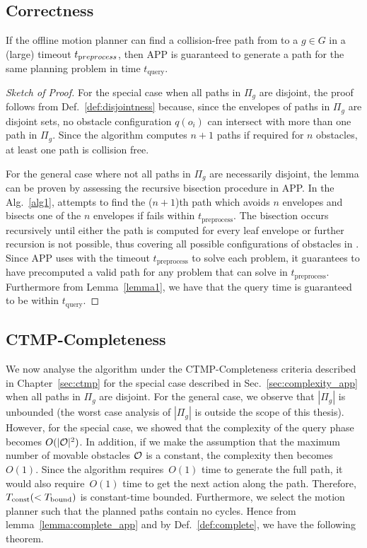 \documentclass[a4paper]{report}
\begin{document}
\subsection{Correctness}
\begin{lemma}
\label{lemma:complete_app}
If the offline motion planner \calP can find a collision-free path from \Sstart to a $g \in G$ in a (large) timeout $t_{\textrm preprocess}$, then APP is guaranteed to generate a path for the same planning problem in time $t_{\textrm {query}}$.
\end{lemma}
\begin{proof}[Sketch of Proof]
For the special case when all paths in $\Pi_g$ are disjoint, the proof follows from Def.~\ref{def:disjointness} because, since the envelopes of paths in $\Pi_g$ are disjoint sets, no obstacle configuration $q(o_i)$ can intersect with more than one path in $\Pi_g$. Since the algorithm computes $n+1$ paths if required for $n$ obstacles, at least one path is collision free.

For the general case where not all paths in $\Pi_g$ are necessarily disjoint, the lemma can be proven by assessing the recursive bisection procedure in APP. In the Alg.~\ref{alg1}, \calP attempts to find the ($n+1$)th path which avoids $n$ envelopes and bisects one of the $n$ envelopes if \calP fails within $t_{\textrm {preprocess}}$. The bisection occurs recursively until either the path is computed for every leaf envelope or further recursion is not possible, thus covering all possible configurations of obstacles in \calO. Since APP uses \calP with the timeout $t_{\textrm {preprocess}}$ to solve each problem, it guarantees to have precomputed a valid path for any problem that \calP can solve in $t_{\textrm {preprocess}}$.
Furthermore from Lemma~\ref{lemma1}, we have that the query time is guaranteed to be within $t_{\textrm {query}}$.
\end{proof}

\subsection{CTMP-Completeness}
We now analyse the algorithm under the CTMP-Completeness criteria described in Chapter~\ref{sec:ctmp} for the special case described in Sec.~\ref{sec:complexity_app} when all paths in $\Pi_g$ are disjoint. For the general case, we observe that $|\Pi_g|$ is unbounded (the worst case analysis of $|\Pi_g|$ is outside the scope of this thesis). However, for the special case, we showed that the complexity of the query phase becomes $O(|\mathcal{O}|^2)$. In addition, if we make the assumption that the maximum number of movable obstacles $\mathcal{O}$ is a constant, the complexity then becomes $O(1)$.
%
Since the algorithm requires~$O(1)$ time to generate the full path, it would also require~$O(1)$ time to get the next action along the path. Therefore, $T_\textrm{const} (< T_{\textrm{bound}})$ is constant-time bounded. Furthermore, we select the motion planner \calP such that the planned paths contain no cycles. Hence from lemma~\ref{lemma:complete_app} and by Def.~\ref{def:complete}, we have the following theorem.
\end{document}

